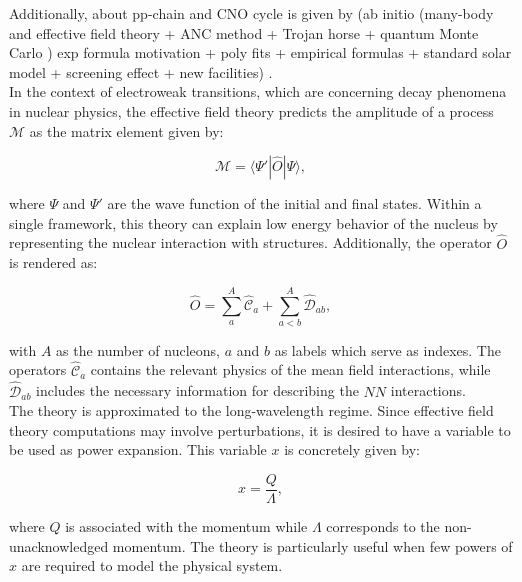 \documentclass[openany]{book}
\begin{document}
Additionally, about pp-chain and CNO cycle  is given by (ab initio (many-body and effective field theory + ANC method + Trojan horse + quantum Monte Carlo ) exp formula motivation + poly fits + empirical formulas +   standard solar model + screening effect + new facilities) \cite{adelberger_garcia_robertson_snover_balantekin_heeger_ramsey-musolf_bemmerer_junghans_bertulani_et_2011}. \\

In the context of electroweak transitions, which are concerning decay phenomena in nuclear physics, the effective field theory predicts the amplitude of a process $\mathcal{M}$ as the matrix element given by:

\begin{equation}\label{micro_EFT_ppCNO_matrix}
	\mathcal{M}=  \langle  \Psi' | \hat {O}  | \Psi  \rangle,
\end{equation}

where $\Psi$ and $\Psi'$ are the wave function of the initial and final states. Within a single framework, this theory can explain low energy behavior of the nucleus by representing the nuclear interaction with structures. Additionally, the operator $\hat O $ is rendered as: 

\begin{equation}\label{micro_EFT_ppCNO_operator}
	 \hat O = \sum_{a}^{A} { \hat {\mathcal{C}}_a } + \sum_{a < b}^{A} { \hat{\mathcal{D}}_{ab}},
\end{equation}

with $A$ as the number of nucleons, $a$ and $b$ as labels which serve as indexes. The operators $\hat {\mathcal{C}}_a$ contains the relevant physics of the mean field interactions, while $\hat{\mathcal{D}}_{ab}$ includes the necessary information for describing the $NN$ interactions. \\

The theory is approximated to the long-wavelength regime. Since effective field theory computations may involve perturbations, it is desired to have a variable to be used as power expansion. This variable $x$ is concretely given by:

\begin{equation}\label{micro_EFT_ppCNO_expansionVariable}
	x  = \frac{Q}{\Lambda},
\end{equation}

where $Q$ is associated with the momentum while $\Lambda$
corresponds to the non-unacknowledged momentum. The theory is particularly useful when few powers of $x$ are required to model the physical system. \\
\end{document}

